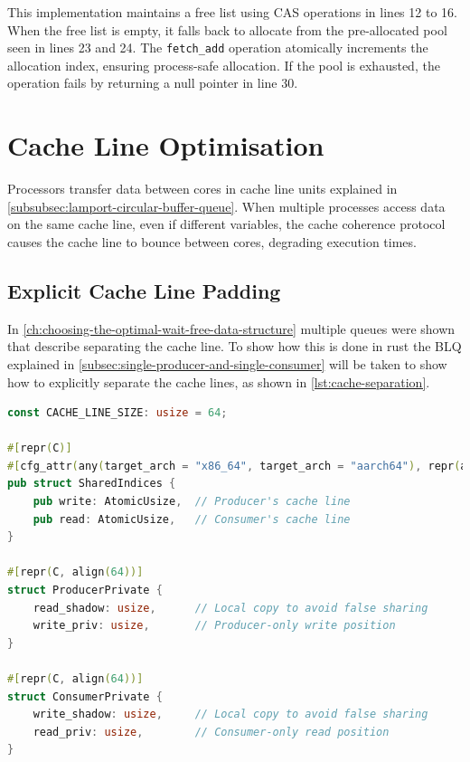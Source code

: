 This implementation maintains a free list using \ac{CAS} operations in lines 12 to 16. When the free list is empty, it falls back to allocate from the pre-allocated pool seen in lines 23 and 24. The \texttt{fetch\_add} operation atomically increments the allocation index, ensuring process-safe allocation. If the pool is exhausted, the operation fails by returning a null pointer in line 30.

\section{Cache Line Optimisation}
Processors transfer data between cores in cache line units explained in \cref{subsubsec:lamport-circular-buffer-queue}. When multiple processes access data on the same cache line, even if different variables, the cache coherence protocol causes the cache line to bounce between cores, degrading execution times.

\subsection{Explicit Cache Line Padding}

In \cref{ch:choosing-the-optimal-wait-free-data-structure} multiple queues were shown that describe separating the cache line. To show how this is done in rust the \ac{BLQ} explained in \cref{subsec:single-producer-and-single-consumer} will be taken to show how to explicitly separate the cache lines, as shown in \cref{lst:cache-separation}.

\begin{lstlisting}[language=Rust, style=boxed, caption={Cache line separation in BlqQueue}, label={lst:cache-separation}]
const CACHE_LINE_SIZE: usize = 64;

#[repr(C)]
#[cfg_attr(any(target_arch = "x86_64", target_arch = "aarch64"), repr(align(64)))]
pub struct SharedIndices {
    pub write: AtomicUsize,  // Producer's cache line
    pub read: AtomicUsize,   // Consumer's cache line
}

#[repr(C, align(64))]
struct ProducerPrivate {
    read_shadow: usize,      // Local copy to avoid false sharing
    write_priv: usize,       // Producer-only write position
}

#[repr(C, align(64))]
struct ConsumerPrivate {
    write_shadow: usize,     // Local copy to avoid false sharing
    read_priv: usize,        // Consumer-only read position
}
\end{lstlisting}

